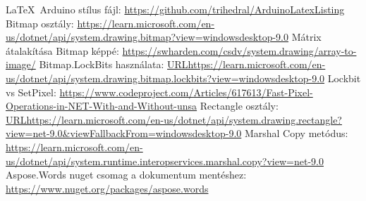 \documentclass[]{thesis-ekf}
\theoremstyle{definition}
\theoremstyle{remark}
\begin{document}
\begin{thebibliography}{9}
 \LaTeX\ Arduino stílus fájl: \url{https://github.com/trihedral/ArduinoLatexListing}
 Bitmap osztály: \url{https://learn.microsoft.com/en-us/dotnet/api/system.drawing.bitmap?view=windowsdesktop-9.0}
 Mátrix átalakítása Bitmap képpé: \url{https://swharden.com/csdv/system.drawing/array-to-image/}
 Bitmap.LockBits használata: \url{URLhttps://learn.microsoft.com/en-us/dotnet/api/system.drawing.bitmap.lockbits?view=windowsdesktop-9.0}
 Lockbit vs SetPixel: \url{https://www.codeproject.com/Articles/617613/Fast-Pixel-Operations-in-NET-With-and-Without-unsa}
 Rectangle osztály: \url{URLhttps://learn.microsoft.com/en-us/dotnet/api/system.drawing.rectangle?view=net-9.0&viewFallbackFrom=windowsdesktop-9.0}
 Marshal Copy metódus: \url{https://learn.microsoft.com/en-us/dotnet/api/system.runtime.interopservices.marshal.copy?view=net-9.0}
 Aspose.Words nuget csomag a dokumentum mentéshez:  \url{https://www.nuget.org/packages/aspose.words}
\end{thebibliography}


\end{document}
